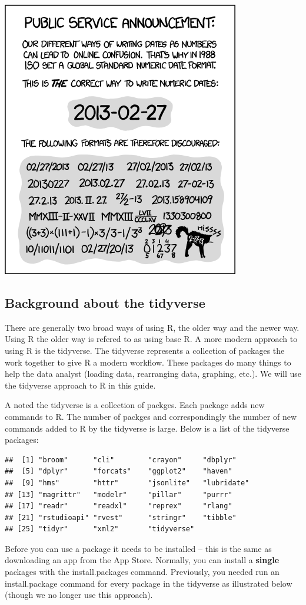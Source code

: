 \documentclass[
]{krantz}
\begin{document}
\includegraphics[width=0.4\linewidth]{ch_introduction/images/iso8601}

\hypertarget{background-about-the-tidyverse}{%
\subsection{Background about the tidyverse}\label{background-about-the-tidyverse}}

There are generally two broad ways of using R, the older way and the newer way. Using R the older way is refered to as using base R. A more modern approach to using R is the tidyverse. The tidyverse represents a collection of packages the work together to give R a modern workflow. These packages do many things to help the data analyst (loading data, rearranging data, graphing, etc.). We will use the tidyverse approach to R in this guide.

A noted the tidyverse is a collection of packges. Each package adds new commands to R. The number of packges and correspondingly the number of new commands added to R by the tidyverse is large. Below is a list of the tidyverse packages:

\begin{verbatim}
##  [1] "broom"      "cli"        "crayon"     "dbplyr"    
##  [5] "dplyr"      "forcats"    "ggplot2"    "haven"     
##  [9] "hms"        "httr"       "jsonlite"   "lubridate" 
## [13] "magrittr"   "modelr"     "pillar"     "purrr"     
## [17] "readr"      "readxl"     "reprex"     "rlang"     
## [21] "rstudioapi" "rvest"      "stringr"    "tibble"    
## [25] "tidyr"      "xml2"       "tidyverse"
\end{verbatim}

Before you can use a package it needs to be installed -- this is the same as downloading an app from the App Store. Normally, you can install a \textbf{single} packages with the install.packages command. Previously, you needed run an install.package command for every package in the tidyverse as illustrated below (though we no longer use this approach).
\end{document}
